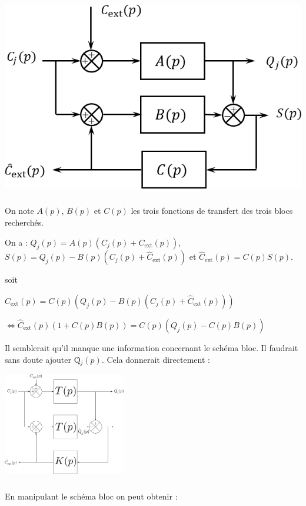 \documentclass[10pt,fleqn]{article} %
\begin{document}
\begin{center}
\includegraphics[width=.4\linewidth]{images/fig_04}
\end{center}

\subparagraph{}%
On note $A(p)$, $B(p)$ et $C(p)$ les trois fonctions de transfert des trois blocs recherchés. 


On a : $Q_j(p)=A(p)\left(C_j(p)+C_{\text{ext}}(p)\right)$, 
$S(p)=Q_j(p)-B(p)\left( C_j(p)+\hat{C}_{\text{ext}}(p) \right)$
et  $\hat{C}_{\text{ext}}(p)=C(p)S(p)$.

 soit 

$\hat{C}_{\text{ext}}(p)=C(p)\left(Q_j(p)-B(p)\left( C_j(p)+\hat{C}_{\text{ext}}(p) \right)\right)$

$\Leftrightarrow \hat{C}_{\text{ext}}(p) \left(1+ C(p)B(p)\right)=C(p)\left(Q_j(p)-C(p)B(p) \right)$

Il semblerait qu'il manque une information concernant le schéma bloc. Il faudrait sans doute ajouter \^{Q}$_j(p)$. Cela donnerait directement :

\begin{center}
\includegraphics[width=0.4\textwidth]{images/DR_B_corrige.pdf}
\end{center}

\subparagraph{}%

En manipulant le schéma bloc on peut obtenir : 
\end{document}
